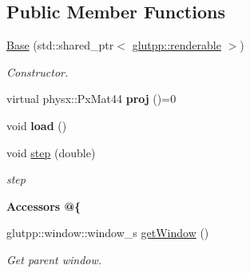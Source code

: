 \subsection*{\-Public \-Member \-Functions}
\begin{DoxyCompactItemize}
\item 
\hypertarget{classglutpp_1_1Camera_1_1Projection_1_1Base_a1682a678dcfd54b0db8de94efcc2d700}{\hyperlink{classglutpp_1_1Camera_1_1Projection_1_1Base_a1682a678dcfd54b0db8de94efcc2d700}{\-Base} (std\-::shared\-\_\-ptr$<$ \hyperlink{classglutpp_1_1renderable}{glutpp\-::renderable} $>$)}\label{classglutpp_1_1Camera_1_1Projection_1_1Base_a1682a678dcfd54b0db8de94efcc2d700}

\begin{DoxyCompactList}\small\item\em \-Constructor. \end{DoxyCompactList}\item 
\hypertarget{classglutpp_1_1Camera_1_1Projection_1_1Base_a675ea3d7add2f1f35dfe78efbd830c2d}{virtual physx\-::\-Px\-Mat44 {\bfseries proj} ()=0}\label{classglutpp_1_1Camera_1_1Projection_1_1Base_a675ea3d7add2f1f35dfe78efbd830c2d}

\item 
\hypertarget{classglutpp_1_1Camera_1_1Projection_1_1Base_a4d348ea3fc3134598b02d373a8d081d5}{void {\bfseries load} ()}\label{classglutpp_1_1Camera_1_1Projection_1_1Base_a4d348ea3fc3134598b02d373a8d081d5}

\item 
void \hyperlink{classglutpp_1_1Camera_1_1Projection_1_1Base_ac42d1a82122668c3958c586eea0d88d3}{step} (double)
\begin{DoxyCompactList}\small\item\em step \end{DoxyCompactList}\end{DoxyCompactItemize}
\begin{Indent}{\bf \-Accessors @\{}\par
\begin{DoxyCompactItemize}
\item 
\hypertarget{classglutpp_1_1Camera_1_1Projection_1_1Base_a341df0c373f2c137f37cc9bfab3d00fd}{glutpp\-::window\-::window\-\_\-s \hyperlink{classglutpp_1_1Camera_1_1Projection_1_1Base_a341df0c373f2c137f37cc9bfab3d00fd}{get\-Window} ()}\label{classglutpp_1_1Camera_1_1Projection_1_1Base_a341df0c373f2c137f37cc9bfab3d00fd}

\begin{DoxyCompactList}\small\item\em \-Get parent window. \end{DoxyCompactList}\end{DoxyCompactItemize}
\end{Indent}
